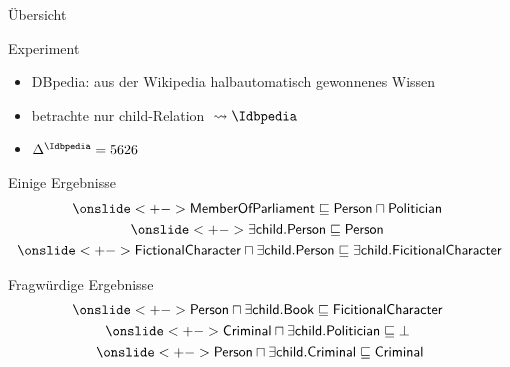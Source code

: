 \documentclass[ngerman]{beamer}
\begin{document}
\begin{frame}[label=current]

  \onslide<+->
  
  Übersicht
  
\end{frame}

\begin{frame}

  \onslide<+->
  
  \begin{block}{Experiment}
    \begin{itemize}
    \item<+-> DBpedia: aus der Wikipedia halbautomatisch gewonnenes Wissen
    \item<+-> betrachte nur \textsf{child}-Relation ${} \leadsto \Idbpedia$
    \item<+-> $\Delta^{\Idbpedia} = 5626$
    \end{itemize}
  \end{block}

  \onslide<+->

  \begin{block}{Einige Ergebnisse}
    \vspace*{-3ex}
    \begin{gather*}
      \onslide<+->{\sf MemberOfParliament \sqsubseteq Person \sqcap Politician}~\\
      \onslide<+->{\sf \exists child. Person \sqsubseteq Person}~\\
      \onslide<+->{\sf FictionalCharacter \sqcap \exists child. Person \sqsubseteq \exists
        child. FicitionalCharacter}
    \end{gather*}
  \end{block}

  \onslide<+->

  \vspace*{-3ex}
  \begin{block}{Fragwürdige Ergebnisse}
    \vspace*{-3ex}
    \begin{gather*}
      \onslide<+->{\sf Person \sqcap \exists child. Book \sqsubseteq
        FicitionalCharacter}~\\
      \onslide<+->{\sf Criminal \sqcap \exists child. Politician \sqsubseteq \bot}~\\
      \onslide<+->{\sf Person \sqcap \exists child. Criminal \sqsubseteq Criminal}
    \end{gather*}
  \end{block}

\end{frame}
\end{document}
